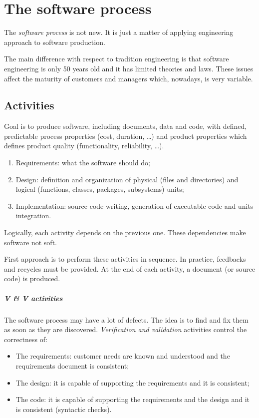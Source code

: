 \chapter{The software process}
The \emph{software process} is not new. It is just a matter of applying engineering approach to software production.

The main difference with respect to tradition engineering is that software engineering is only 50 years old and it has limited theories and laws. These issues affect the maturity of customers and managers which, nowadays, is very variable.

\section{Activities}
Goal is to produce software, including documents, data and code, with defined, predictable process properties (cost, duration, \dots) and product properties which defines product quality (functionality, reliability, \dots).
\begin{enumerate}
\item Requirements: what the software should do;
\item Design: definition and organization of physical (files and directories) and logical (functions, classes, packages, subsystems) units;
\item Implementation: source code writing, generation of executable code and units integration.
\end{enumerate}
Logically, each activity depends on the previous one. These dependencies make software not soft.

First approach is to perform these activities in sequence. In practice, feedbacks and recycles must be provided. At the end of each activity, a document (or source code) is produced.

\paragraph{V \& V activities}
The software process may have a lot of defects. The idea is to find and fix them as soon as they are discovered. \emph{Verification and validation} activities control the correctness of:
\begin{itemize}
\item The requirements: customer needs are known and understood and the requirements document is consistent;
\item The design: it is capable of supporting the requirements and it is consistent;
\item The code: it is capable of supporting the requirements and the design and it is consistent (syntactic checks).
\end{itemize}

